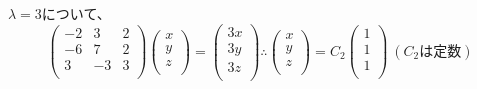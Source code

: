 \documentclass[]{jsarticle}
\begin{document}
        $\lambda = 3$について、
            \begin{equation*}
                \begin{pmatrix}
                    -2 & 3 & 2 \\
                    -6 & 7 & 2 \\
                    3 & -3 & 3 \\
                \end{pmatrix}
                \begin{pmatrix}
                    x \\
                    y \\
                    z \\
                \end{pmatrix} =
                \begin{pmatrix}
                    3x \\
                    3y \\
                    3z \\
                \end{pmatrix}
                \therefore
                \begin{pmatrix}
                    x \\
                    y \\
                    z \\
                \end{pmatrix} =
                C_2\begin{pmatrix}
                    1 \\
                    1 \\
                    1 \\
                \end{pmatrix} \
                (C_2は定数)
            \end{equation*}
\end{document}
